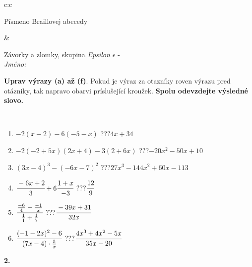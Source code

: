 \documentclass[10pt]{report}
\begin{document}
\begin{tabular}{c:c}
\begin{minipage}[c][104.5mm][t]{0.5\linewidth}
\begin{center}
\begin{minipage}{0.20\linewidth}
\begin{center}
{\small Písmeno Braillovej abecedy}
\end{center}
\end{minipage}
\end{center}
\end{minipage}
&
\begin{minipage}[c][104.5mm][t]{0.5\linewidth}
\begin{center}
\vspace{7mm}
{\huge Závorky a zlomky, skupina \textit{Epsilon $\epsilon$} -}\\[5mm]
\textit{Jméno:}\phantom{xxxxxxxxxxxxxxxxxxxxxxxxxxxxxxxxxxxxxxxxxxxxxxxxxxxxxxxxxxxxxxxxx}\\[5mm]
\begin{minipage}{0.95\linewidth}
\begin{center}
\textbf{Uprav výrazy (a) až (f)}. Pokud je výraz za otazníky roven výrazu pred otázniky, tak napravo obarvi príslušející kroužek. \textbf{Spolu odevzdejte výsledné slovo.}
\end{center}
\end{minipage}
\\[1mm]
\begin{minipage}{0.79\linewidth}
\begin{center}
\begin{varwidth}{\linewidth}
\begin{enumerate}
\normalsize
\item $-2(x-2)-6(-5-x)$\quad \dotfill\; ???\;\dotfill \quad $4x+34$
\item $-2(-2+5x)(2x+4)-3(2+6x)$\quad \dotfill\; ???\;\dotfill \quad $-20x^2-50x+10$
\item $(3x-4)^3-(-6x-7)^2$\quad \dotfill\; ???\;\dotfill \quad $27x^3-144x^2+60x-113$
\item $\cfrac{-6x+2}{3}+6\cfrac{1+x}{-3}$\quad \dotfill\; ???\;\dotfill \quad $\cfrac{12}{9}$
\item $\cfrac{\frac{-6}{4}-\frac{-1}{x}}{\frac{1}{1}+\frac{1}{7}}$\quad \dotfill\; ???\;\dotfill \quad $\cfrac{-39x+31}{32x}$
\item $\cfrac{(-1-2x)^2-6}{(7x-4)\cdot\frac{5}{x}}$\quad \dotfill\; ???\;\dotfill \quad $\cfrac{4x^3+4x^2-5x}{35x-20}$
\end{enumerate}
\end{varwidth}
\end{center}
\end{minipage}
\begin{minipage}{0.20\linewidth}
\begin{center}
{\Huge\bfseries 2.} \\[2mm]

\end{center}
\end{minipage}
\end{center}
\end{minipage}
\end{tabular}
\end{document}
